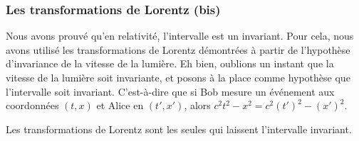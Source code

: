 \subsubsection{Les transformations de Lorentz (bis)}

Nous avons prouvé qu'en relativité, l'intervalle est un invariant. Pour cela, nous avons utilisé les transformations de Lorentz démontrées à partir de l'hypothèse d'invariance de la vitesse de la lumière. Eh bien, oublions un instant que la vitesse de la lumière soit invariante, et posons à la place comme hypothèse que l'intervalle soit invariant. C'est-à-dire que si Bob mesure un événement aux coordonnées \( (t,x)\) et Alice en \( (t',x')\), alors \( c^2t^2-x^2=c^2(t')^2-(x')^2\).

\begin{theorem}
	Les transformations de Lorentz sont les seules qui laissent l'intervalle invariant.
\end{theorem}

